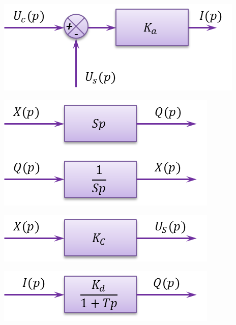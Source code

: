 \documentclass[10pt,fleqn]{article} %
\begin{document}
\begin{multicols}{2}
\begin{corrige}
\begin{minipage}[c]{.23\linewidth}
\begin{center}
\includegraphics[width=.95\textwidth]{images/bloc1}
\end{center}
\end{minipage}\hfill
\begin{minipage}[c]{.23\linewidth}
\begin{center}
\includegraphics[width=.95\textwidth]{images/bloc2}
\end{center}
\end{minipage}\hfill
\begin{minipage}[c]{.23\linewidth}
\begin{center}
\includegraphics[width=.95\textwidth]{images/bloc3}
\end{center}
\end{minipage}\hfill
\begin{minipage}[c]{.23\linewidth}
\begin{center}
\includegraphics[width=.95\textwidth]{images/bloc4}
\end{center}
\end{minipage}




\end{corrige}
\end{multicols}
\end{document}
